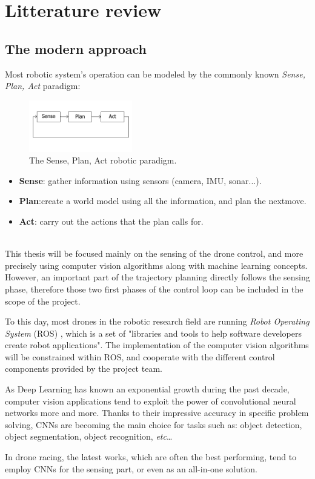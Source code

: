 \section{Litterature review}

\subsection{The modern approach}
Most robotic system's operation can be modeled by the commonly known
\emph{Sense, Plan, Act} paradigm:
\begin{figure}[h]
	\centering
	\includegraphics[width=0.4\textwidth]{figure/robotic_paradigm.png}
	\caption{The Sense, Plan, Act robotic paradigm.}
	\label{fig:robotic_paradigm}
\end{figure}

\begin{itemize}
	\item{\textbf{Sense}}: gather information using sensors (camera, IMU, sonar...).
	\item{\textbf{Plan}}:create a world model using all the information, and plan
		the nextmove.
	\item{\textbf{Act}}: carry out the actions that the plan calls for.
\end{itemize}
~\\
This thesis will be focused mainly on the sensing of the drone control, and
more precisely using computer vision algorithms along with machine learning
concepts. However, an important part of the trajectory planning directly
follows the sensing phase, therefore those two first phases of the control loop
can be included in the scope of the project.

To this day, most drones in the robotic research field are running \emph{Robot
Operating System} (ROS) , which is a set of "libraries and
tools to help software developers create robot applications". The implementation
of the computer vision algorithms will be constrained within ROS, and cooperate
with the different control components provided by the project team.\\


As Deep Learning has known an exponential growth during the past decade,
computer vision applications tend to exploit the power of convolutional neural
networks more and more. Thanks to their impressive accuracy in specific problem
solving, CNNs are becoming the main choice for tasks such as: object detection,
object segmentation, object recognition, \emph{etc}\ldots

In drone racing, the latest works, which are often the best performing, tend to
employ CNNs for the sensing part, or even as an all-in-one solution.\\
